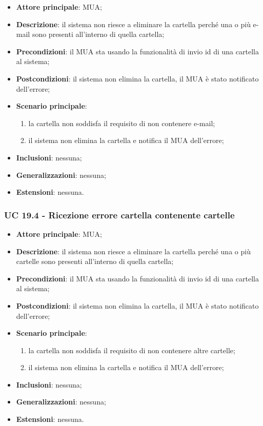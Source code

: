     \begin{itemize}
        \item \textbf{Attore principale}: MUA;
        \item \textbf{Descrizione}: il sistema non riesce a eliminare la cartella perché una o più e-mail sono presenti all'interno di quella cartella;
        \item \textbf{Precondizioni}: il MUA sta usando la funzionalità di invio id di una cartella al sistema;
        \item \textbf{Postcondizioni}: il sistema non elimina la cartella, il MUA è stato notificato dell'errore;
        \item \textbf{Scenario principale}:
            \begin{enumerate}
                \item la cartella non soddisfa il requisito di non contenere e-mail;
                \item il sistema non elimina la cartella e notifica il MUA dell'errore;
            \end{enumerate}
        \item \textbf{Inclusioni}: nessuna;
        \item \textbf{Generalizzazioni}: nessuna;
        \item \textbf{Estensioni}: nessuna.
    \end{itemize}


    \subsubsection{UC 19.4 - Ricezione errore cartella contenente cartelle} \label{sec:UC19.4}

    \begin{itemize}
        \item \textbf{Attore principale}: MUA;
        \item \textbf{Descrizione}: il sistema non riesce a eliminare la cartella perché una o più cartelle sono presenti all'interno di quella cartella;
        \item \textbf{Precondizioni}: il MUA sta usando la funzionalità di invio id di una cartella al sistema;
        \item \textbf{Postcondizioni}: il sistema non elimina la cartella, il MUA è stato notificato dell'errore;
        \item \textbf{Scenario principale}:
            \begin{enumerate}
                \item la cartella non soddisfa il requisito di non contenere altre cartelle;
                \item il sistema non elimina la cartella e notifica il MUA dell'errore;
            \end{enumerate}
        \item \textbf{Inclusioni}: nessuna;
        \item \textbf{Generalizzazioni}: nessuna;
        \item \textbf{Estensioni}: nessuna.
    \end{itemize}

